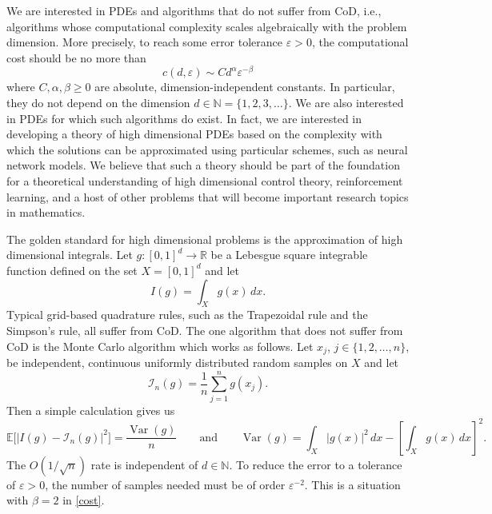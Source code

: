 \documentclass[12pt]{article}
\theoremstyle{definition}
\newcommand{\R}{\mathbb{R}}
\newcommand{\EE}{\mathbb{E}}
\newcommand{\N}{\mathbb{N}}
\newcommand{\bx}{{x}}
\newcommand{\eps}{\varepsilon}
\begin{document}
We are interested in PDEs and algorithms that do not suffer from CoD, i.e., 
algorithms whose computational complexity scales algebraically with the problem dimension.
More precisely, 
to reach some error tolerance $ \eps > 0 $, the computational cost should be no more than
\begin{equation}
c(d, \eps) \sim C d^{\alpha} \eps^{-\beta}
\label{cost}
\end{equation}
where $ C, \alpha, \beta \geq 0 $ are absolute, dimension-independent constants. 
In particular, they do not depend on the dimension
$ d \in \N = \{ 1, 2, 3, \dots \} $. We are also interested in PDEs for which such algorithms do exist.  In fact, we are interested in developing a theory of high dimensional
PDEs based on the complexity with which the solutions can be approximated using particular schemes, such as neural network models.
We believe that such a theory should be part of the foundation for a theoretical understanding of high dimensional control theory,
reinforcement learning, and a host of other problems that will become important research topics in mathematics.
 
The golden standard for high dimensional problems is the approximation of high dimensional integrals.
Let $ g \colon [0,1]^d \to \R $ be a Lebesgue square integrable function defined on the set $ X = [0, 1]^d $ and let
%
\begin{equation}
\label{eq:integral_intro}
  I(g) = \int_{X} g(\bx) \, dx
  .
\end{equation}
Typical grid-based quadrature rules, such as the Trapezoidal rule and the Simpson's rule,
all suffer from  CoD. The one algorithm that does not suffer from CoD
is the Monte Carlo algorithm which works as follows.
Let $ \bx_j $, $ j \in \{ 1, 2, \dots, n \} $, be 
independent, continuous uniformly distributed random samples on $ X $ and let
\begin{equation}
  \mathcal{I}_n(g) = \frac 1n \sum_{ j = 1 }^n g(\bx_j)
  .
\end{equation}
Then a simple calculation gives us
\begin{equation}
  \EE\big[ | I(g) - \mathcal{I}_n(g) |^2 \big] 
= \frac{\operatorname{Var}(g)}n
\qquad 
  \text{and}
\qquad
  \operatorname{Var}(g) 
  = \int_X | g(\bx) |^2 \, d\bx 
  - 
  \left[ \int_X g(\bx) \, d\bx \right]^2.
\label{MC-rate}
\end{equation}
The $O(1/\sqrt{n})$ rate is independent of $ d \in \N $.
To reduce the error to a tolerance of $ \eps > 0 $, 
the number of samples needed must be of order $ \eps^{ - 2 } $.
This is a situation with $\beta=2$ in \eqref{cost}.
\end{document}
